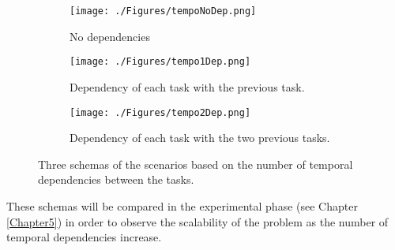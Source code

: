 	\begin{figure}[!h]
	\centering
		\begin{subfigure}[b]{0.9\textwidth}
			\texttt{[image: ./Figures/tempoNoDep.png]}
			\centering
			\caption{No dependencies}
			\label{fig:tempoNoDep}
		\end{subfigure}
		\begin{subfigure}[b]{0.9\textwidth}
			\texttt{[image: ./Figures/tempo1Dep.png]}
			\centering
			\caption{Dependency of each task with the previous task.}
			\label{fig:tempo1Dep}
		\end{subfigure}
		\begin{subfigure}[b]{0.9\textwidth}
			\texttt{[image: ./Figures/tempo2Dep.png]}
			\centering
			\caption{Dependency of each task with the two previous tasks.}
			\label{fig:tempo2Dep}
		\end{subfigure}
		\caption{Three schemas of the scenarios based on the number of temporal dependencies between the tasks.}
		\label{fig:tempo}
	\end{figure}
	
These schemas will be compared in the experimental phase (see Chapter \ref{Chapter5}) in order to observe the scalability of the problem as the number of temporal dependencies increase.
